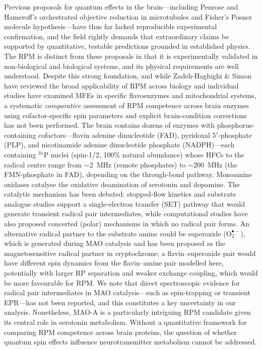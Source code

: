 \documentclass[11pt]{article}
\begin{document}
Previous proposals for quantum effects in the brain---including Penrose and Hameroff's orchestrated objective reduction in microtubules and Fisher's Posner molecule hypothesis\cite{Fisher2015}---have thus far lacked reproducible experimental confirmation, and the field rightly demands that extraordinary claims be supported by quantitative, testable predictions grounded in established physics. The RPM is distinct from these proposals in that it is experimentally validated in non-biological\cite{Steiner1989} and biological\cite{Xu2021} systems, and its physical requirements are well understood. Despite this strong foundation, and while Zadeh-Haghighi \& Simon\cite{ZadehHaghighi2022} have reviewed the broad applicability of RPM across biology and individual studies have examined MFEs in specific flavoenzymes\cite{Maeda2012,Jones2009} and mitochondrial systems\cite{Usselman2016}, a systematic \emph{comparative} assessment of RPM competence across brain enzymes using cofactor-specific spin parameters and explicit brain-condition corrections has not been performed. The brain contains dozens of enzymes with phosphorus-containing cofactors---flavin adenine dinucleotide (FAD), pyridoxal 5$'$-phosphate (PLP), and nicotinamide adenine dinucleotide phosphate (NADPH)---each containing $^{31}$P nuclei (spin-1/2, 100\% natural abundance) whose HFCs to the radical centre range from $\sim$2~MHz (remote phosphates) to $\sim$200~MHz (the FMN-phosphate in FAD\cite{Weber1998}), depending on the through-bond pathway. Monoamine oxidases catalyse the oxidative deamination of serotonin and dopamine. The catalytic mechanism has been debated: stopped-flow kinetics\cite{Ramsay1991} and substrate analogue studies support a single-electron transfer (SET) pathway that would generate transient radical pair intermediates, while computational studies have also proposed concerted (polar) mechanisms in which no radical pair forms. An alternative radical partner to the substrate amine could be superoxide ($\mathrm{O}_2^{\bullet-}$), which is generated during MAO catalysis and has been proposed as the magnetosensitive radical partner in cryptochrome\cite{Player2019}; a flavin--superoxide pair would have different spin dynamics from the flavin--amine pair modelled here, potentially with larger RP separation and weaker exchange coupling, which would be more favourable for RPM. We note that direct spectroscopic evidence for radical pair intermediates in MAO catalysis---such as spin-trapping or transient EPR---has not been reported, and this constitutes a key uncertainty in our analysis. Nonetheless, MAO-A is a particularly intriguing RPM candidate given its central role in serotonin metabolism. Without a quantitative framework for comparing RPM competence across brain proteins, the question of whether quantum spin effects influence neurotransmitter metabolism cannot be addressed.
\end{document}
